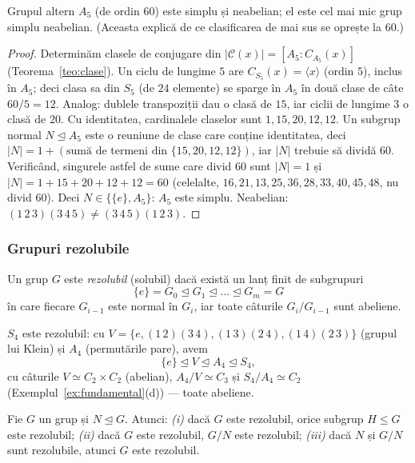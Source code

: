 \begin{propozitie}\label{prop:A5}
Grupul altern $A_5$ (de ordin $60$) este simplu și neabelian; el este cel mai mic grup simplu neabelian. (Aceasta explică de ce clasificarea de mai sus se oprește la $60$.)
\end{propozitie}

\begin{proof}
Determinăm clasele de conjugare din $|\mathcal C(x)|=[A_5:C_{A_5}(x)]$ (Teorema~\ref{teo:clase}). Un ciclu de lungime $5$ are $C_{S_5}(x)=\langle x\rangle$ (ordin $5$), inclus în $A_5$; deci clasa sa din $S_5$ (de $24$ elemente) se sparge în $A_5$ în două clase de câte $60/5=12$. Analog: dublele transpoziții dau o clasă de $15$, iar ciclii de lungime $3$ o clasă de $20$. Cu identitatea, cardinalele claselor sunt $1,15,20,12,12$. Un subgrup normal $N\trianglelefteq A_5$ este o reuniune de clase care conține identitatea, deci $|N|=1+(\text{sumă de termeni din }\{15,20,12,12\})$, iar $|N|$ trebuie să dividă $60$. Verificând, singurele astfel de sume care divid $60$ sunt $|N|=1$ și $|N|=1+15+20+12+12=60$ (celelalte, $16,21,13,25,36,28,33,40,45,48$, nu divid $60$). Deci $N\in\{\{e\},A_5\}$: $A_5$ este simplu. Neabelian: $(1\,2\,3)(3\,4\,5)\neq(3\,4\,5)(1\,2\,3)$.
\end{proof}

\subsubsection*{Grupuri rezolubile}

\begin{definitie}
Un grup $G$ este \emph{rezolubil} (solubil) dacă există un lanț finit de subgrupuri
\[
\{e\}=G_0\trianglelefteq G_1\trianglelefteq\dots\trianglelefteq G_m=G
\]
în care fiecare $G_{i-1}$ este normal în $G_i$, iar toate câturile $G_i/G_{i-1}$ sunt abeliene.
\end{definitie}

\begin{exemplu}
$S_4$ este rezolubil: cu $V=\{e,(1\,2)(3\,4),(1\,3)(2\,4),(1\,4)(2\,3)\}$ (grupul lui Klein) și $A_4$ (permutările pare), avem
\[
\{e\}\trianglelefteq V\trianglelefteq A_4\trianglelefteq S_4,
\]
cu câturile $V\simeq C_2\times C_2$ (abelian), $A_4/V\simeq C_3$ și $S_4/A_4\simeq C_2$ (Exemplul~\ref{ex:fundamental}(d)) --- toate abeliene.
\end{exemplu}

\begin{propozitie}\label{prop:rezolubil}
Fie $G$ un grup și $N\trianglelefteq G$. Atunci:
\emph{(i)} dacă $G$ este rezolubil, orice subgrup $H\le G$ este rezolubil;
\emph{(ii)} dacă $G$ este rezolubil, $G/N$ este rezolubil;
\emph{(iii)} dacă $N$ și $G/N$ sunt rezolubile, atunci $G$ este rezolubil.
\end{propozitie}

